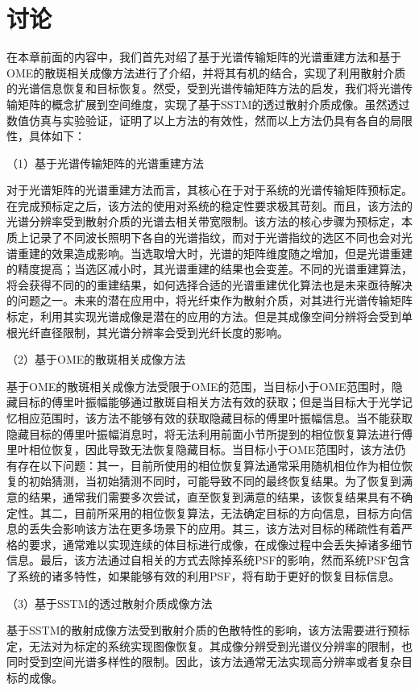 \section{讨论}

在本章前面的内容中，我们首先对绍了基于光谱传输矩阵的光谱重建方法和基于OME的散斑相关成像方法进行了介绍，并将其有机的结合，实现了利用散射介质的光谱信息恢复和目标恢复。然受，受到光谱传输矩阵方法的启发，我们将光谱传输矩阵的概念扩展到空间维度，实现了基于SSTM的透过散射介质成像。虽然透过数值仿真与实验验证，证明了以上方法的有效性，然而以上方法仍具有各自的局限性，具体如下：

（1）基于光谱传输矩阵的光谱重建方法

对于光谱矩阵的光谱重建方法而言，其核心在于对于系统的光谱传输矩阵预标定。在完成预标定之后，该方法的使用对系统的稳定性要求极其苛刻。而且，该方法的光谱分辨率受到散射介质的光谱去相关带宽限制。该方法的核心步骤为预标定，本质上记录了不同波长照明下各自的光谱指纹，而对于光谱指纹的选区不同也会对光谱重建的效果造成影响。当选取增大时，光谱的矩阵维度随之增加，但是光谱重建的精度提高；当选区减小时，其光谱重建的结果也会变差。不同的光谱重建算法，将会获得不同的的重建结果，如何选择合适的光谱重建优化算法也是未来亟待解决的问题之一。未来的潜在应用中，将光纤束作为散射介质，对其进行光谱传输矩阵标定，利用其实现光谱成像是潜在的应用的方法。但是其成像空间分辨将会受到单根光纤直径限制，其光谱分辨率会受到光纤长度的影响。

（2）基于OME的散斑相关成像方法

基于OME的散斑相关成像方法受限于OME的范围，当目标小于OME范围时，隐藏目标的傅里叶振幅能够通过散斑自相关方法有效的获取；但是当目标大于光学记忆相应范围时，该方法不能够有效的获取隐藏目标的傅里叶振幅信息。当不能获取隐藏目标的傅里叶振幅消息时，将无法利用前面小节所提到的相位恢复算法进行傅里叶相位恢复，因此导致无法恢复隐藏目标。当目标小于OME范围时，该方法仍有存在以下问题：其一，目前所使用的相位恢复算法通常采用随机相位作为相位恢复的初始猜测，当初始猜测不同时，可能导致不同的最终恢复结果。为了恢复到满意的结果，通常我们需要多次尝试，直至恢复到满意的结果，该恢复结果具有不确定性。其二，目前所采用的相位恢复算法，无法确定目标的方向信息，目标方向信息的丢失会影响该方法在更多场景下的应用。其三，该方法对目标的稀疏性有着严格的要求，通常难以实现连续的体目标进行成像，在成像过程中会丢失掉诸多细节信息。最后，该方法通过自相关的方式去除掉系统PSF的影响，然而系统PSF包含了系统的诸多特性，如果能够有效的利用PSF，将有助于更好的恢复目标信息。

（3）基于SSTM的透过散射介质成像方法

基于SSTM的散射成像方法受到散射介质的色散特性的影响，该方法需要进行预标定，无法对为标定的系统实现图像恢复。其成像分辨受到光谱仪分辨率的限制，也同时受到空间光谱多样性的限制。因此，该方法通常无法实现高分辨率或者复杂目标的成像。

